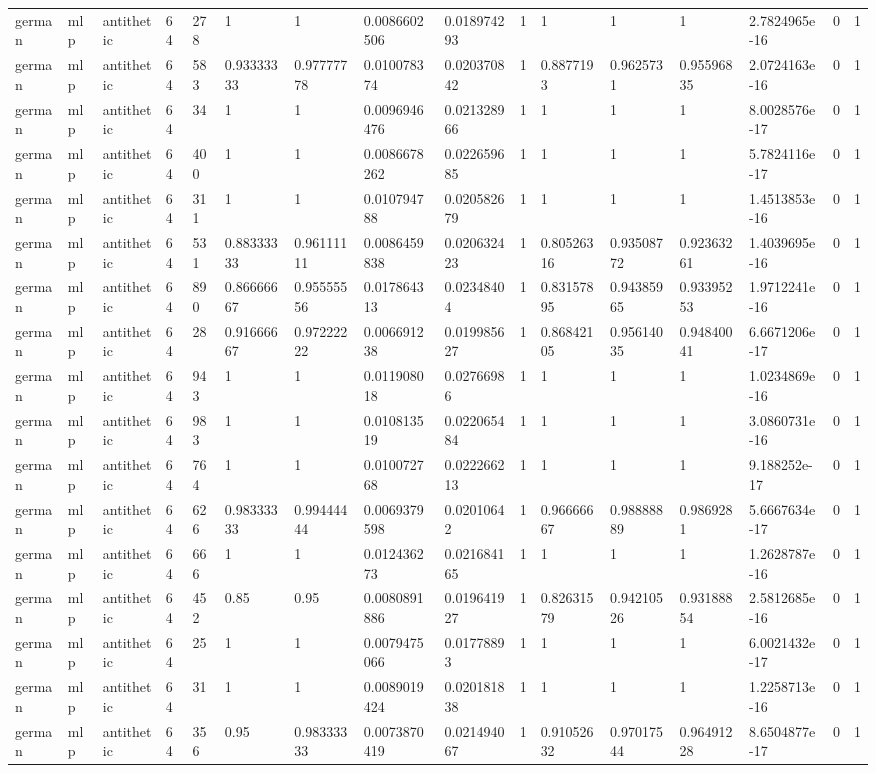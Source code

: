\begin{tabular}{llllllllllllllll}
german & mlp & antithetic & 64 & 278 & 1 & 1 & 0.0086602506 & 0.018974293 & 1 & 1 & 1 & 1 & 2.7824965e-16 & 0 & 1 \\
german & mlp & antithetic & 64 & 583 & 0.93333333 & 0.97777778 & 0.010078374 & 0.020370842 & 1 & 0.8877193 & 0.9625731 & 0.95596835 & 2.0724163e-16 & 0 & 1 \\
german & mlp & antithetic & 64 & 34 & 1 & 1 & 0.0096946476 & 0.021328966 & 1 & 1 & 1 & 1 & 8.0028576e-17 & 0 & 1 \\
german & mlp & antithetic & 64 & 400 & 1 & 1 & 0.0086678262 & 0.022659685 & 1 & 1 & 1 & 1 & 5.7824116e-17 & 0 & 1 \\
german & mlp & antithetic & 64 & 311 & 1 & 1 & 0.010794788 & 0.020582679 & 1 & 1 & 1 & 1 & 1.4513853e-16 & 0 & 1 \\
german & mlp & antithetic & 64 & 531 & 0.88333333 & 0.96111111 & 0.0086459838 & 0.020632423 & 1 & 0.80526316 & 0.93508772 & 0.92363261 & 1.4039695e-16 & 0 & 1 \\
german & mlp & antithetic & 64 & 890 & 0.86666667 & 0.95555556 & 0.017864313 & 0.02348404 & 1 & 0.83157895 & 0.94385965 & 0.93395253 & 1.9712241e-16 & 0 & 1 \\
german & mlp & antithetic & 64 & 28 & 0.91666667 & 0.97222222 & 0.006691238 & 0.019985627 & 1 & 0.86842105 & 0.95614035 & 0.94840041 & 6.6671206e-17 & 0 & 1 \\
german & mlp & antithetic & 64 & 943 & 1 & 1 & 0.011908018 & 0.02766986 & 1 & 1 & 1 & 1 & 1.0234869e-16 & 0 & 1 \\
german & mlp & antithetic & 64 & 983 & 1 & 1 & 0.010813519 & 0.022065484 & 1 & 1 & 1 & 1 & 3.0860731e-16 & 0 & 1 \\
german & mlp & antithetic & 64 & 764 & 1 & 1 & 0.010072768 & 0.022266213 & 1 & 1 & 1 & 1 & 9.188252e-17 & 0 & 1 \\
german & mlp & antithetic & 64 & 626 & 0.98333333 & 0.99444444 & 0.0069379598 & 0.02010642 & 1 & 0.96666667 & 0.98888889 & 0.9869281 & 5.6667634e-17 & 0 & 1 \\
german & mlp & antithetic & 64 & 666 & 1 & 1 & 0.012436273 & 0.021684165 & 1 & 1 & 1 & 1 & 1.2628787e-16 & 0 & 1 \\
german & mlp & antithetic & 64 & 452 & 0.85 & 0.95 & 0.0080891886 & 0.019641927 & 1 & 0.82631579 & 0.94210526 & 0.93188854 & 2.5812685e-16 & 0 & 1 \\
german & mlp & antithetic & 64 & 25 & 1 & 1 & 0.0079475066 & 0.01778893 & 1 & 1 & 1 & 1 & 6.0021432e-17 & 0 & 1 \\
german & mlp & antithetic & 64 & 31 & 1 & 1 & 0.0089019424 & 0.020181838 & 1 & 1 & 1 & 1 & 1.2258713e-16 & 0 & 1 \\
german & mlp & antithetic & 64 & 356 & 0.95 & 0.98333333 & 0.0073870419 & 0.021494067 & 1 & 0.91052632 & 0.97017544 & 0.96491228 & 8.6504877e-17 & 0 & 1 \\
\bottomrule
\end{tabular}
